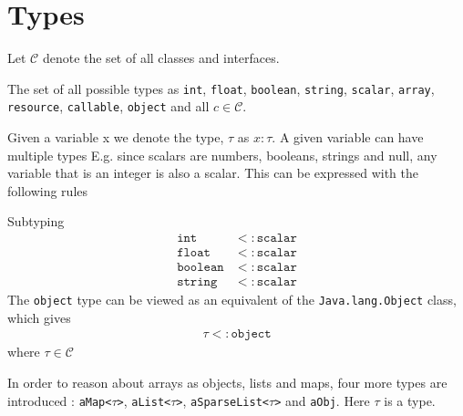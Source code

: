 
\newcommand{\pvar}[1]{#1}
\newcommand{\px}{x}
\newcommand{\pint}{\texttt{int}}
\newcommand{\pfloat}{\texttt{float}}
\newcommand{\pscalar}{\texttt{scalar}}
\newcommand{\pbool}{\texttt{boolean}}
\newcommand{\pstring}{\texttt{string}}
\newcommand{\parray}{\texttt{array}}
\newcommand{\pcallable}{\texttt{callable}}
\newcommand{\pamap}[1][\tau]{\texttt{aMap<$#1$>}}
\newcommand{\paobj}{\texttt{aObj}}
\newcommand{\palst}[1][\tau]{\texttt{aList<$#1$>}}
\newcommand{\paslst}[1][\tau]{\texttt{aSparseList<$#1$>}}
\newcommand{\presource}{\texttt{resource}}
\newcommand{\pobject}{\texttt{object}}
\newcommand{\pnull}{\texttt{null}}

\section{Types}
\begin{definition}
Let $\mathcal{C}$ denote the set of all classes and interfaces. 
\end{definition}
\begin{definition}
The set of all possible types as \pint, \pfloat, \pbool, \pstring, \pscalar, \parray, \presource, \pcallable, \pobject{} and all $c \in \mathcal{C}$.
\end{definition}


Given a variable \pvar{x} we denote the type, $\tau$ as $\pvar{x} : \tau $. A given variable can have multiple types E.g. since scalars are numbers, booleans, strings and null, any variable that is an integer is also a scalar. This can be expressed with the following rules 

\begin{definition} 
Subtyping
\begin{align}
\pint &<:  \pscalar \\
\pfloat &<: \pscalar \\
\pbool &<:  \pscalar \\
\pstring &<: \pscalar
\end{align}
The \pobject{} type can be viewed as an equivalent of the \texttt{Java.lang.Object} class, which gives 
\begin{align}
\tau <: \pobject
\end{align}
where $\tau \in \mathcal{C}$
\end{definition}

In order to reason about arrays as objects, lists and maps, four more types are introduced : \pamap, \palst{}, \paslst{} and \paobj. Here $\tau$ is a type. 

